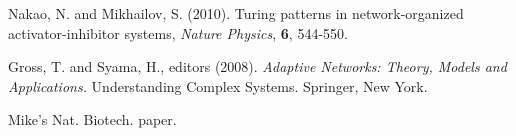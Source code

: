 \documentclass{bioinfo}
\begin{document}
\begin{thebibliography}{}
	
 Nakao, N. and Mikhailov, S. (2010). Turing patterns in network-organized activator-inhibitor systems, {\it Nature Physics}, {\bf 6}, 544-550.

 Gross, T. and Syama, H., editors (2008). {\it Adaptive Networks: Theory, Models and Applications.} Understanding Complex Systems. Springer, New York.

 Mike's Nat. Biotech. paper.

\end{thebibliography}
\end{document}
